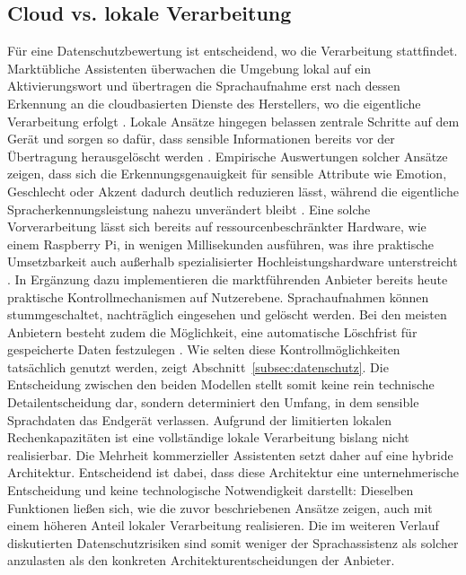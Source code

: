 \subsection{Cloud vs. lokale Verarbeitung}
\label{subsec:cloud}
Für eine Datenschutzbewertung ist entscheidend, wo die Verarbeitung stattfindet. Marktübliche Assistenten überwachen die Umgebung lokal auf ein Aktivierungswort und übertragen die Sprachaufnahme erst nach dessen Erkennung an die cloudbasierten Dienste des Herstellers, wo die eigentliche Verarbeitung erfolgt \cite{Quinn2024}. Lokale Ansätze hingegen belassen zentrale Schritte auf dem Gerät und sorgen so dafür, dass sensible Informationen bereits vor der Übertragung herausgelöscht werden \cite{Aloufi2023}. Empirische Auswertungen solcher Ansätze zeigen, dass sich die Erkennungsgenauigkeit für sensible Attribute wie Emotion, Geschlecht oder Akzent dadurch deutlich reduzieren lässt, während die eigentliche Spracherkennungsleistung nahezu unverändert bleibt \cite{Aloufi2023}. Eine solche Vorverarbeitung lässt sich bereits auf ressourcenbeschränkter Hardware, wie einem Raspberry Pi, in wenigen Millisekunden ausführen, was ihre praktische Umsetzbarkeit auch außerhalb spezialisierter Hochleistungshardware unterstreicht \cite{Aloufi2023}. In Ergänzung dazu implementieren die marktführenden Anbieter bereits heute praktische Kontrollmechanismen auf Nutzerebene. Sprachaufnahmen können stummgeschaltet, nachträglich eingesehen und gelöscht werden. Bei den meisten Anbietern besteht zudem die Möglichkeit, eine automatische Löschfrist für gespeicherte Daten festzulegen \cite{HernandezAcosta2022}. Wie selten diese Kontrollmöglichkeiten tatsächlich genutzt werden, zeigt Abschnitt~\ref{subsec:datenschutz}. Die Entscheidung zwischen den beiden Modellen stellt somit keine rein technische Detailentscheidung dar, sondern determiniert den Umfang, in dem sensible Sprachdaten das Endgerät verlassen. Aufgrund der limitierten lokalen Rechenkapazitäten ist eine vollständige lokale Verarbeitung bislang nicht realisierbar. Die Mehrheit kommerzieller Assistenten setzt daher auf eine hybride Architektur. Entscheidend ist dabei, dass diese Architektur eine unternehmerische Entscheidung und keine technologische Notwendigkeit darstellt: Dieselben Funktionen ließen sich, wie die zuvor beschriebenen Ansätze zeigen, auch mit einem höheren Anteil lokaler Verarbeitung realisieren. Die im weiteren Verlauf diskutierten Datenschutzrisiken sind somit weniger der Sprachassistenz als solcher anzulasten als den konkreten Architekturentscheidungen der Anbieter.

